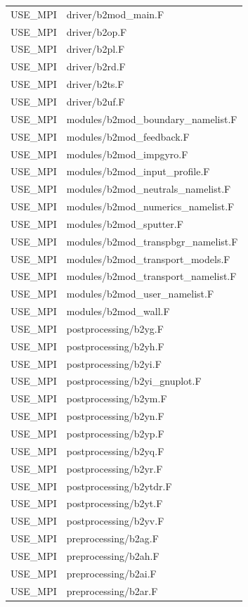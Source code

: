 \documentclass[a4paper,10pt]{report}
\begin{document}
\begin{center}
\begin{longtable}{|l|l|}
USE\_MPI & driver/b2mod\_main.F \\
USE\_MPI & driver/b2op.F \\
USE\_MPI & driver/b2pl.F \\
USE\_MPI & driver/b2rd.F \\
USE\_MPI & driver/b2ts.F \\
USE\_MPI & driver/b2uf.F \\
USE\_MPI & modules/b2mod\_boundary\_namelist.F \\
USE\_MPI & modules/b2mod\_feedback.F \\
USE\_MPI & modules/b2mod\_impgyro.F \\
USE\_MPI & modules/b2mod\_input\_profile.F \\
USE\_MPI & modules/b2mod\_neutrals\_namelist.F \\
USE\_MPI & modules/b2mod\_numerics\_namelist.F \\
USE\_MPI & modules/b2mod\_sputter.F \\
USE\_MPI & modules/b2mod\_transpbgr\_namelist.F \\
USE\_MPI & modules/b2mod\_transport\_models.F \\
USE\_MPI & modules/b2mod\_transport\_namelist.F \\
USE\_MPI & modules/b2mod\_user\_namelist.F \\
USE\_MPI & modules/b2mod\_wall.F \\
USE\_MPI & postprocessing/b2yg.F \\
USE\_MPI & postprocessing/b2yh.F \\
USE\_MPI & postprocessing/b2yi.F \\
USE\_MPI & postprocessing/b2yi\_gnuplot.F \\
USE\_MPI & postprocessing/b2ym.F \\
USE\_MPI & postprocessing/b2yn.F \\
USE\_MPI & postprocessing/b2yp.F \\
USE\_MPI & postprocessing/b2yq.F \\
USE\_MPI & postprocessing/b2yr.F \\
USE\_MPI & postprocessing/b2ytdr.F \\
USE\_MPI & postprocessing/b2yt.F \\
USE\_MPI & postprocessing/b2yv.F \\
USE\_MPI & preprocessing/b2ag.F \\
USE\_MPI & preprocessing/b2ah.F \\
USE\_MPI & preprocessing/b2ai.F \\
USE\_MPI & preprocessing/b2ar.F \\

\end{longtable}
\end{center}
\end{document}
